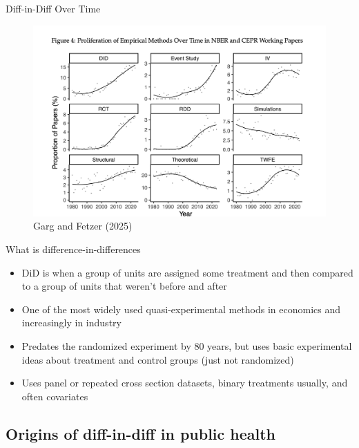\documentclass{beamer}
\begin{document}
\begin{frame}{Diff-in-Diff Over Time}

	\begin{figure}
	\caption{Garg and Fetzer (2025)}
	\includegraphics[scale=0.25]{./lecture_includes/did_growth1}
	\end{figure}

\end{frame}



\begin{frame}{What is difference-in-differences}

\begin{itemize}
\item DiD is when a group of units are assigned some treatment and then compared to a group of units that weren't before and after
\item One of the most widely used quasi-experimental methods in economics and increasingly in industry
\item Predates the randomized experiment by 80 years, but uses basic experimental ideas about treatment and control groups (just not randomized)
\item Uses panel or repeated cross section datasets, binary treatments usually, and often covariates
\end{itemize}
\end{frame}


\subsection{Origins of diff-in-diff in public health}
\end{document}
